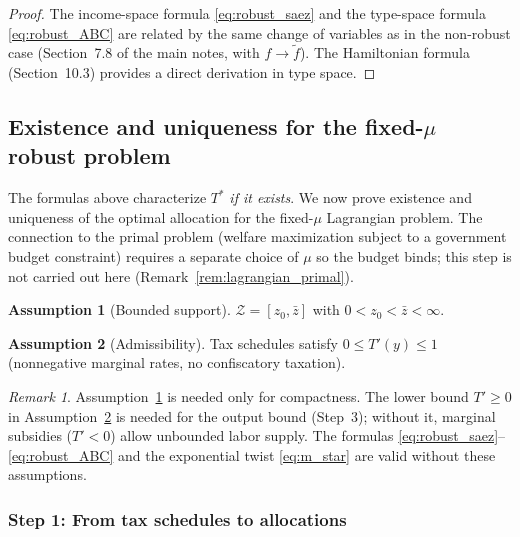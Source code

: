 \documentclass[12pt,a4paper]{article}
\theoremstyle{definition}
\newtheorem{assumption}{Assumption}[section]
\theoremstyle{plain}
\theoremstyle{remark}
\newtheorem{remark}{Remark}[section]
\newcommand{\zbar}{\bar{z}}
\newcommand{\zlow}{z_{\scriptscriptstyle 0}}
\newcommand{\calZ}{\mathcal{Z}}
\begin{document}
\begin{proof}
The income-space formula \eqref{eq:robust_saez} and the
type-space formula \eqref{eq:robust_ABC} are related by
the same change of variables as in the non-robust case
(Section~7.8 of the main notes, with $f \to \widetilde f$).
The Hamiltonian formula (Section~10.3) provides a direct
derivation in type space.
\end{proof}


\subsection{Existence and uniqueness for the
fixed-$\mu$ robust problem}
\label{sec:existence}

The formulas above characterize $T^*$ \emph{if it exists}.
We now prove existence and uniqueness of the optimal
allocation for the fixed-$\mu$ Lagrangian problem.  The
connection to the primal problem (welfare maximization
subject to a government budget constraint) requires a
separate choice of $\mu$ so the budget binds; this step
is not carried out here
(Remark~\ref{rem:lagrangian_primal}).

\begin{assumption}[Bounded support]
\label{as:bounded}
$\calZ = [\zlow, \zbar]$ with $0 < \zlow < \zbar < \infty$.
\end{assumption}

\begin{assumption}[Admissibility]
\label{as:admissible}
Tax schedules satisfy $0 \leq T'(y) \leq 1$ (nonnegative
marginal rates, no confiscatory taxation).
\end{assumption}

\begin{remark}
Assumption~\ref{as:bounded} is needed only for compactness.
The lower bound $T' \geq 0$ in
Assumption~\ref{as:admissible} is needed for the output
bound (Step~3); without it, marginal subsidies ($T' < 0$)
allow unbounded labor supply.
The formulas
\eqref{eq:robust_saez}--\eqref{eq:robust_ABC} and the
exponential twist \eqref{eq:m_star} are valid without
these assumptions.
\end{remark}


\subsubsection{Step 1: From tax schedules to allocations}
\end{document}

